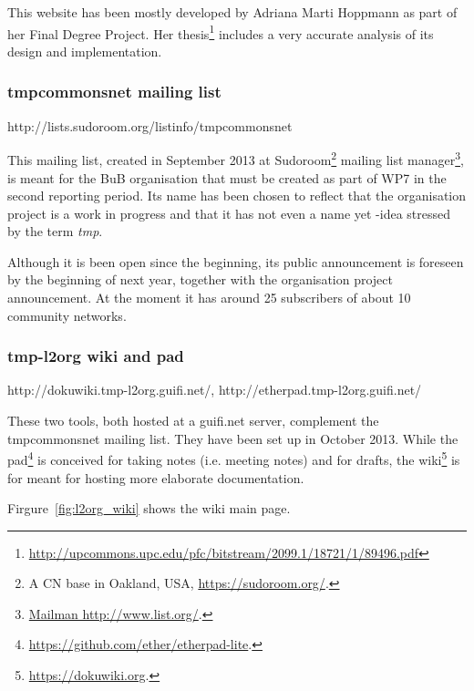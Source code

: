 This website has been mostly developed by Adriana Marti Hoppmann as part of her Final Degree Project. Her thesis\footnote{\url{http://upcommons.upc.edu/pfc/bitstream/2099.1/18721/1/89496.pdf}} includes a very accurate analysis of its design and implementation.


\subsubsection{tmpcommonsnet mailing list}

http://lists.sudoroom.org/listinfo/tmpcommonsnet

This mailing list, created in September 2013 at Sudoroom\footnote{A CN base in Oakland, USA, \url{https://sudoroom.org/}.} mailing list manager\footnote{\url{Mailman http://www.list.org/}.}, is meant for the BuB organisation that must be created as part of WP7 in the second reporting period. Its name has been chosen to reflect that the organisation project is a work in progress and that it has not even a name yet -idea stressed by the term \emph{tmp}.

Although it is been open since the beginning, its public announcement is foreseen by the beginning of next year, together with the organisation project announcement. At the moment it has around 25 subscribers of about 10 community networks.


\subsubsection{tmp-l2org wiki and pad}

http://dokuwiki.tmp-l2org.guifi.net/, http://etherpad.tmp-l2org.guifi.net/

These two tools, both hosted at a guifi.net server, complement the tmpcommonsnet mailing list. They have been set up in October 2013. While the pad\footnote{\url{https://github.com/ether/etherpad-lite}.} is conceived for taking notes (i.e. meeting notes) and for drafts, the wiki\footnote{\url{https://dokuwiki.org}.} is for meant for hosting more elaborate documentation.

Firgure~\ref{fig:l2org_wiki} shows the wiki main page.
 
